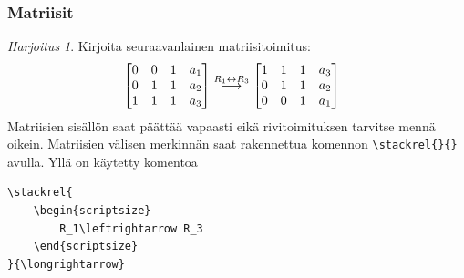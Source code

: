 \documentclass[handout]{beamer}
\theoremstyle{remark}
\newtheorem{harj}{Harjoitus}[section]
\begin{document}
\begin{frame}[fragile]
\frametitle{Matriisit}
\begin{harj}
Kirjoita seuraavanlainen matriisitoimitus: 
\begin{align*}
&
\begin{bmatrix*}[r]
0 & 0 & 1 & a_1\\
0 & 1 & 1 & a_2\\
1 & 1 & 1 & a_3
\end{bmatrix*}
\stackrel{\begin{scriptsize} R_1\leftrightarrow R_3 \end{scriptsize} }{\longrightarrow}
\begin{bmatrix*}[r]
1 & 1 & 1 & a_3\\
0 & 1 & 1 & a_2\\
0 & 0 & 1 & a_1
\end{bmatrix*}
\end{align*}
Matriisien sisällön saat päättää vapaasti eikä rivitoimituksen tarvitse mennä oikein. Matriisien välisen merkinnän saat rakennettua komennon \verb-\stackrel{}{}- avulla. Yllä on käytetty komentoa
\begin{verbatim}
\stackrel{
	\begin{scriptsize} 
		R_1\leftrightarrow R_3 
	\end{scriptsize}
}{\longrightarrow} 
\end{verbatim}

\end{harj}
\end{frame}
\end{document}
